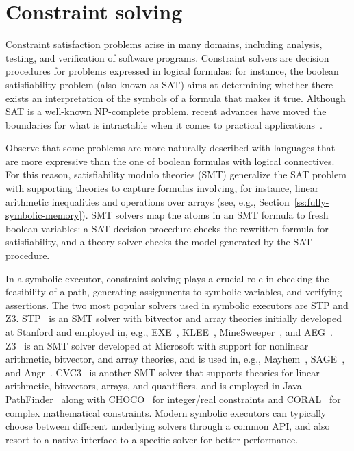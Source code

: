 
\section{Constraint solving}
\label{se:constraint-solving}

Constraint satisfaction problems arise in many domains, including analysis, testing, and verification of software programs. Constraint solvers are decision procedures for problems expressed in logical formulas: for instance, the boolean satisfiability problem (also known as SAT) aims at determining whether there exists an interpretation of the symbols of a formula that makes it true. Although SAT is a well-known NP-complete problem, recent advances have moved the boundaries for what is intractable when it comes to practical applications~\cite{SMT-CACM11}. 

Observe that some problems are more naturally described with languages that are more expressive than the one of boolean formulas with logical connectives. For this reason, satisfiability modulo theories (SMT) generalize the SAT problem with supporting theories to capture formulas involving, for instance, linear arithmetic inequalities and operations over arrays (see, e.g., Section~\ref{ss:fully-symbolic-memory}). SMT solvers map the atoms in an SMT formula to fresh boolean variables: a SAT decision procedure checks the rewritten formula for satisfiability, and a theory solver checks the model generated by the SAT procedure.

In a symbolic executor, constraint solving plays a crucial role in checking the feasibility of a path, generating assignments to symbolic variables, and verifying assertions. The two most popular solvers used in symbolic executors are STP and Z3. STP~\cite{STP-CAV07,STP-TR07} is an SMT solver with bitvector and array theories initially developed at Stanford and employed in, e.g., {\sc EXE}~\cite{EXE-CCS06}, {\sc KLEE}~\cite{KLEE-OSDI08}, {\sc MineSweeper}~\cite{MineSweeper-BOTNET08}, and {\sc AEG}~\cite{AEG-NDSS11}. Z3~\cite{Z3-TACS08} is an SMT solver developed at Microsoft with support for nonlinear arithmetic, bitvector, and array theories, and is used in, e.g., {\sc Mayhem}~\cite{MAYHEM-SP12}, {\sc SAGE}~\cite{SAGE-QUEUE12}, and {\sc Angr}~\cite{ANGR-SSP16}. CVC3~\cite{CVC3-CAV07} is another SMT solver that supports theories for linear arithmetic, bitvectors, arrays, and quantifiers, and is employed in {\sc Java PathFinder}~\cite{PATHFINDER-ASE10} along with CHOCO~\cite{CHOCO} for integer/real constraints and CORAL~\cite{CORAL-NFM11} for complex mathematical constraints. Modern symbolic executors can typically choose between different underlying solvers through a common API, and also resort to a native interface to a specific solver for better performance.

